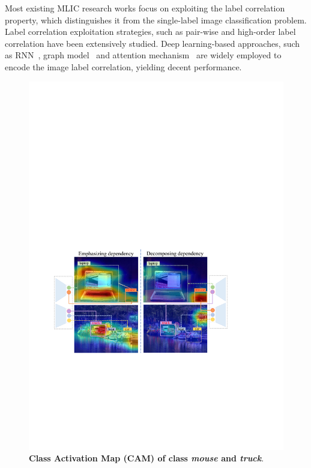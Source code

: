 \documentclass{article}
\begin{document}
Most existing MLIC research works focus on exploiting the label correlation property, which distinguishes it from the single-label image classification problem.
Label correlation exploitation strategies, such as pair-wise and high-order label correlation have been extensively studied.
Deep learning-based approaches, such as RNN~\cite{wang2016cnn}, graph model~\cite{chen2019learning,chen2019multi,nguyen2021modular} and attention mechanism~\cite{gao2021learning} are widely employed to encode the image label correlation, yielding decent performance.
\begin{figure}[t]
    \centering
    \vspace{-0.1cm}
    \includegraphics[scale=0.13]{figure/motivation.pdf}
    \vspace{-0.3cm}
    \caption{\textbf{Class Activation Map (CAM) of class \emph{mouse} and \emph{truck}}.
}
\end{figure}
\end{document}
